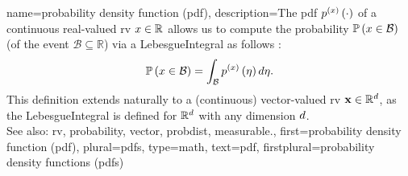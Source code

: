 {name={probability density function (pdf)},
	description={The pdf 
		$p^{(x)}\left(\cdot\right)$ of a \gls{continuous} real-valued \gls{rv} $x \in \mathbb{R}$ 
		allows us to compute the \gls{probability} $\mathbb{P}\left(x \in \mathcal{B}\right)$ (of 
		the \gls{event} $\mathcal{B} \subseteq \mathbb{R}$)
		via a \gls{LebesgueIntegral} as follows \cite[Ch. 3]{BertsekasProb}:
	 	$$\mathbb{P}\left(x \in \mathcal{B}\right) = \int_{\mathcal{B}} p^{(x)}\left(\eta\right) d 
	 	\eta.$$ 
	 	This definition extends naturally to a (\gls{continuous}) \gls{vector}-valued \gls{rv} 
		${\bf x} \in \mathbb{R}^{d}$, as the \gls{LebesgueIntegral} 
	 	is defined for $\mathbb{R}^{d}$ with any \gls{dimension} $d$. 
        		\\
		See also: \gls{rv}, \gls{probability}, \gls{vector}, \gls{probdist}, \gls{measurable}.},
	first={probability density function (pdf)},
	plural={pdfs},
	type=math,
	text={pdf},
	firstplural={probability density functions (pdfs)}
}

